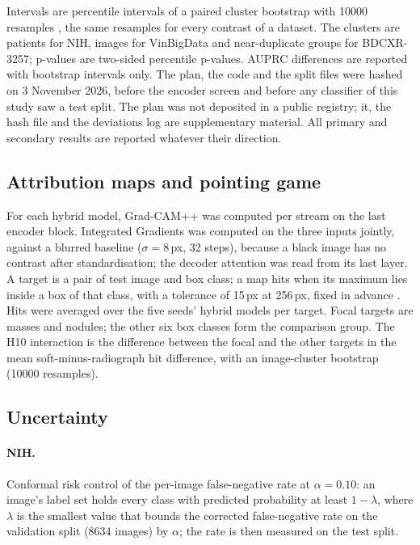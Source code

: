 Intervals are percentile intervals of a paired cluster bootstrap with \num{10000} resamples \citep{efron1993bootstrap}, the same resamples
for every contrast of a dataset. The clusters are patients for NIH, images for VinBigData and near-duplicate groups for BDCXR-3257;
p-values are two-sided percentile p-values. AUPRC differences are reported with bootstrap intervals only. The plan, the code and the split
files were hashed on 3 November 2026, before the encoder screen and before any classifier of this study saw a test split. The plan was not
deposited in a public registry; it, the hash file and the deviations log are supplementary material. All primary and secondary results are
reported whatever their direction.

\subsection{Attribution maps and pointing game}
\label{sec:cls_xai}
For each hybrid model, Grad-CAM++ \citep{chattopadhay2018gradcampp} was computed per stream on the last encoder block. Integrated Gradients
\citep{sundararajan2017axiomatic} was computed on the three inputs jointly, against a blurred baseline ($\sigma=8$\,px, 32 steps), because a
black image has no contrast after standardisation; the decoder attention was read from its last layer. A target is a pair of test image
and box class; a map hits when its maximum lies inside a box of that class, with a tolerance of 15\,px at 256\,px, fixed in advance
\citep{zhang2018topdown}. Hits were averaged over the five seeds' hybrid models per target. Focal targets are masses and nodules; the other
six box classes form the comparison group. The H10 interaction is the difference between the focal and the other targets in the mean
soft-minus-radiograph hit difference, with an image-cluster bootstrap (\num{10000} resamples).

\subsection{Uncertainty}
\label{sec:cls_uq}
\paragraph{NIH.} Conformal risk control \citep{angelopoulos2022crc} of the per-image false-negative rate at $\alpha=0.10$: an image's label
set holds every class with predicted probability at least $1-\lambda$, where $\lambda$ is the smallest value that bounds the corrected
false-negative rate on the validation split (\num{8634} images) by $\alpha$; the rate is then measured on the test split.
